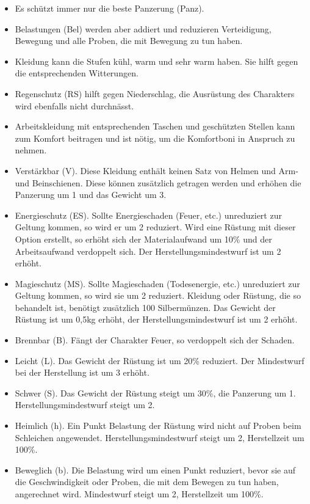 \documentclass{article}
\begin{document}
\begin{itemize}
\item Es schützt immer nur die beste Panzerung (Panz).
\item Belastungen (Bel) werden aber addiert und reduzieren Verteidigung, Bewegung und alle Proben, die mit Bewegung zu tun haben.
\item Kleidung kann die Stufen kühl, warm und sehr warm haben. Sie hilft gegen die entsprechenden Witterungen.
\item Regenschutz (RS) hilft gegen Niederschlag, die Ausrüstung des Charakters wird ebenfalls nicht durchnässt.
\item Arbeitskleidung mit entsprechenden Taschen und geschützten Stellen kann zum Komfort beitragen und ist nötig, um die Komfortboni in Anspruch zu nehmen.
\item Verstärkbar (V). Diese Kleidung enthält keinen Satz von Helmen und Arm- und Beinschienen. Diese können zusätzlich getragen werden und erhöhen die Panzerung um 1 und das Gewicht um 3.
\item Energieschutz (ES). Sollte Energieschaden (Feuer, etc.) unreduziert zur Geltung kommen, so wird er um 2 reduziert. Wird eine Rüstung mit dieser Option erstellt, so erhöht sich der Materialaufwand um 10\% und der Arbeitsaufwand verdoppelt sich. Der Herstellungsmindestwurf ist um 2 erhöht.
\item Magieschutz (MS). Sollte Magieschaden (Todesenergie, etc.) unreduziert zur Geltung kommen, so wird sie um 2 reduziert. Kleidung oder Rüstung, die so behandelt ist, benötigt zusätzlich 100 Silbermünzen. Das Gewicht der Rüstung ist um 0,5kg erhöht, der Herstellungsmindestwurf ist um 2 erhöht.
\item Brennbar (B). Fängt der Charakter Feuer, so verdoppelt sich der Schaden.
\item Leicht (L). Das Gewicht der Rüstung ist um 20\% reduziert. Der Mindestwurf bei der Herstellung ist um 3 erhöht.
\item Schwer (S). Das Gewicht der Rüstung steigt um 30\%, die Panzerung um 1. Herstellungsmindestwurf steigt um 2.
\item Heimlich (h). Ein Punkt Belastung der Rüstung wird nicht auf Proben beim Schleichen angewendet. Herstellungsmindestwurf steigt um 2, Herstellzeit um 100\%.
\item Beweglich (b). Die Belastung wird um einen Punkt reduziert, bevor sie auf die Geschwindigkeit oder Proben, die mit dem Bewegen zu tun haben, angerechnet wird. Mindestwurf steigt um 2, Herstellzeit um 100\%.
\end{itemize}
\end{document}
